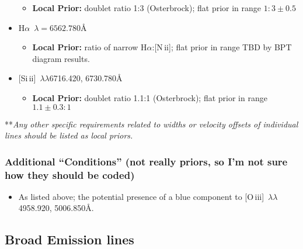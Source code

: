 \documentclass[12pt,letterpaper]{article}
\newcommand{\Halpha}{\ifmmode {\rm H}\alpha \else H$\alpha$\fi}
\newcommand{\nii}{N\,{\sc ii}}
\newcommand{\oiii}{O\,{\sc iii}}
\newcommand{\Sizw}{Si\,{\sc ii}}
\begin{document}
\begin{itemize}
\begin{itemize}
          \item {\bf Local Prior:} doublet ratio 1:3 (Osterbrock); flat prior in range $1:3\pm 0.5$
        \end{itemize}
      \item \Halpha\ $\lambda=6562.780$\AA
        \begin{itemize}
          \item {\bf Local Prior:} ratio of narrow \Halpha:[\nii]; flat prior in range TBD by BPT diagram results.
        \end{itemize}
      \item {[\Sizw]\, $\lambda \lambda$6716.420, 6730.780\AA}
        \begin{itemize}
          \item {\bf Local Prior:} doublet ratio 1.1:1 (Osterbrock); flat prior in range $1.1\pm 0.3:1$
        \end{itemize}
    \end{itemize}

**{\it Any other specific requirements related to widths or velocity offsets of individual lines should be listed as local priors.}

\subsubsection*{Additional ``Conditions'' (not really priors, so I'm not sure how they should be coded)}
\begin{itemize}
   \item As listed above; the potential presence of a blue component to
    [\oiii]\, $\lambda \lambda$4958.920, 5006.850\AA.
\end{itemize} 
\subsection*{Broad Emission lines}
\end{document}
